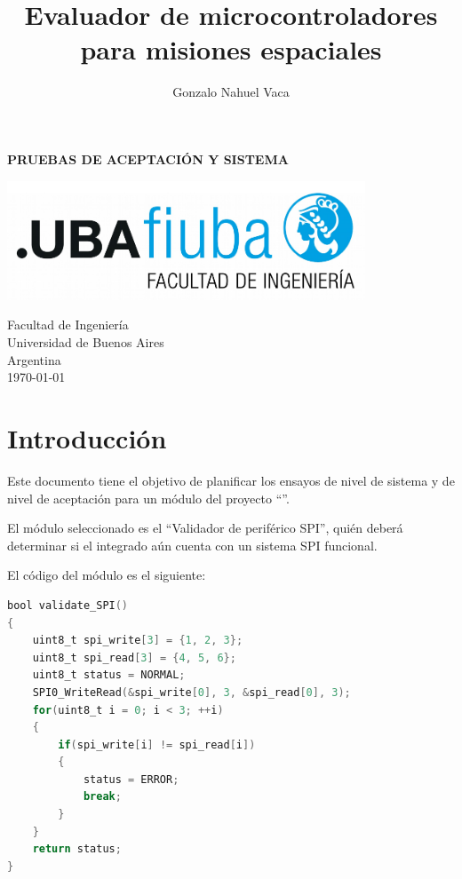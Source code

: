 \documentclass[
    11pt,
    spanish,
	a4paper
]{article}
\title{Evaluador de microcontroladores para misiones espaciales}
\author{Gonzalo Nahuel Vaca}
\def\doctype{PRUEBAS DE ACEPTACIÓN Y SISTEMA}
\begin{document}
\makeatletter
\begin{titlepage}
	\begin{center}
		\vspace*{1cm}
		
		\Huge
		\textbf{\doctype}
		
		\vspace{0.5cm}
		\LARGE
		\@title
		
		\vspace{1.5cm}
		
		\textbf{\@author}

		\vspace{3.5cm}

		\includegraphics[width=0.8\textwidth]{img/logoFIUBA.pdf}
		
		\vfill
		Facultad de Ingeniería\\
		Universidad de Buenos Aires\\
		Argentina\\
		\today
	\end{center}
\end{titlepage}
\makeatother
\newpage

\section{Introducción}
\label{sec:introduccion}

Este documento tiene el objetivo de planificar los ensayos de nivel de sistema y de nivel de aceptación para un módulo del proyecto ``\MyTitle''.

El módulo seleccionado es el ``Validador de periférico SPI'', quién deberá determinar si el integrado aún cuenta con un sistema SPI funcional.

El código del módulo es el siguiente:

\begin{lstlisting}[language=C]
bool validate_SPI()
{
    uint8_t spi_write[3] = {1, 2, 3};
    uint8_t spi_read[3] = {4, 5, 6};
    uint8_t status = NORMAL;
    SPI0_WriteRead(&spi_write[0], 3, &spi_read[0], 3);
    for(uint8_t i = 0; i < 3; ++i)
    {
        if(spi_write[i] != spi_read[i])
        {
            status = ERROR;
            break;
        }
    }
    return status;
}
\end{lstlisting}
\end{document}

